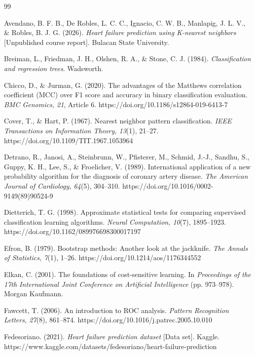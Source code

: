 \documentclass[12pt,a4paper]{article}
\begin{document}
\newpage
\begin{thebibliography}{99}
\setlength{\itemsep}{0.6em}

Avendano, B. F. B., De Robles, L. C. C., Ignacio, C. W. B., Manlapig, J. L. V., \& Robles, B. J. G. (2026). \emph{Heart failure prediction using K-nearest neighbors} [Unpublished course report]. Bulacan State University.

Breiman, L., Friedman, J. H., Olshen, R. A., \& Stone, C. J. (1984). \emph{Classification and regression trees}. Wadsworth.

Chicco, D., \& Jurman, G. (2020). The advantages of the Matthews correlation coefficient (MCC) over F1 score and accuracy in binary classification evaluation. \emph{BMC Genomics, 21}, Article 6. https://doi.org/10.1186/s12864-019-6413-7

Cover, T., \& Hart, P. (1967). Nearest neighbor pattern classification. \emph{IEEE Transactions on Information Theory, 13}(1), 21--27. https://doi.org/10.1109/TIT.1967.1053964

Detrano, R., Janosi, A., Steinbrunn, W., Pfisterer, M., Schmid, J.-J., Sandhu, S., Guppy, K. H., Lee, S., \& Froelicher, V. (1989). International application of a new probability algorithm for the diagnosis of coronary artery disease. \textit{The American Journal of Cardiology, 64}(5), 304--310. https://doi.org/10.1016/0002-9149(89)90524-9

Dietterich, T. G. (1998). Approximate statistical tests for comparing supervised classification learning algorithms. \emph{Neural Computation, 10}(7), 1895--1923. https://doi.org/10.1162/089976698300017197

Efron, B. (1979). Bootstrap methods: Another look at the jackknife. \emph{The Annals of Statistics, 7}(1), 1--26. https://doi.org/10.1214/aos/1176344552

Elkan, C. (2001). The foundations of cost-sensitive learning. In \emph{Proceedings of the 17th International Joint Conference on Artificial Intelligence} (pp. 973--978). Morgan Kaufmann.

Fawcett, T. (2006). An introduction to ROC analysis. \emph{Pattern Recognition Letters, 27}(8), 861--874. https://doi.org/10.1016/j.patrec.2005.10.010

Fedesoriano. (2021). \emph{Heart failure prediction dataset} [Data set]. Kaggle. https://www.kaggle.com/datasets/fedesoriano/heart-failure-prediction


\end{thebibliography}
\end{document}
